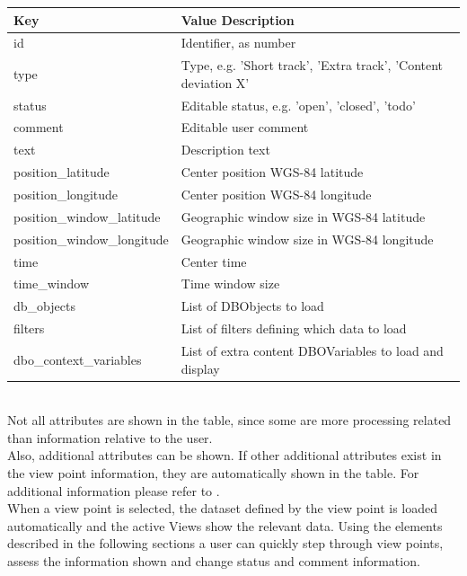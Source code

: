 \begin{center}
 \begin{table}[H]
  \begin{tabularx}{\textwidth}{ | l | X | }
    \hline
    \textbf{Key} & \textbf{Value Description} \\ \hline
    id & Identifier, as number \\ \hline
    type & Type, e.g. 'Short track', 'Extra track', 'Content deviation X'  \\ \hline
    status & Editable status, e.g. 'open', 'closed', 'todo' \\ \hline
    comment & Editable user comment \\ \hline
    text & Description text \\ \hline
    position\_latitude & Center position WGS-84 latitude \\ \hline
    position\_longitude & Center position WGS-84 longitude \\ \hline
    position\_window\_latitude & Geographic window size in WGS-84 latitude  \\ \hline
    position\_window\_longitude & Geographic window size in WGS-84 longitude  \\ \hline
    time & Center time  \\ \hline
    time\_window & Time window size \\ \hline
    db\_objects & List of DBObjects to load \\ \hline
    filters & List of filters defining which data to load \\ \hline
    dbo\_context\_variables & List of extra content DBOVariables to load and display \\ \hline
\end{tabularx}
\end{table}
\end{center}
\ \\

Not all attributes are shown in the table, since some are more processing related than information relative to the user. \\

Also, additional attributes can be shown. If other additional attributes exist in the view point information, they are automatically shown in the table. For additional information please refer to . \\

When a view point is selected, the dataset defined by the view point is loaded automatically and the active Views show the relevant data. Using the elements described in the following sections a user can quickly step through view points, assess the information shown and change status and comment information. \\

